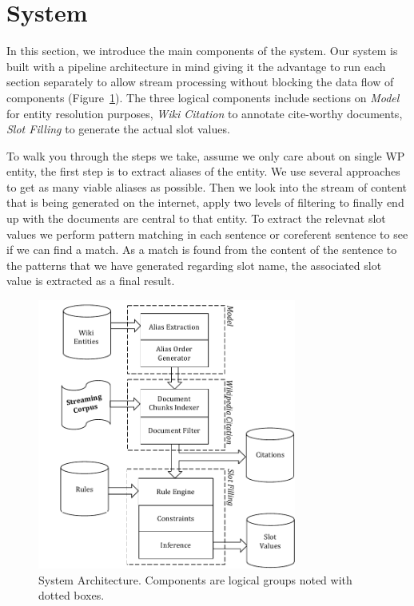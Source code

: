 
\section{System}

In this section, we introduce the main components of the system. Our system is built with a pipeline architecture in mind giving it the advantage to run each section separately to allow stream processing without blocking the data flow of components (Figure~\ref{fig:system}). The three logical components include sections on \textit{Model} for entity resolution purposes, \textit{Wiki Citation} to annotate cite-worthy documents, \textit{Slot Filling} to generate the actual slot values.


To walk you through the steps we take, assume we only care about on single WP entity, the first step is to extract aliases of the entity. We use several approaches to get as many viable aliases as possible. Then we look into the stream of content that is being generated on the internet, apply two levels of filtering to finally end up with the documents are central to that entity. To extract the relevnat slot values we perform pattern matching in each sentence or coreferent sentence to see if we can find a match. As a match is found from the content of the sentence to the patterns that we have generated regarding slot name, the associated slot value is extracted as a final result.


\begin{figure}
\hspace{-10mm}
  \centering
  \includegraphics[width=8.5cm]{./images/System_Diagram_with_model_Vertical-crop.pdf}
  \vspace*{-.1in} 
  \caption{System Architecture.
  Components are logical groups noted with dotted boxes.}
  \label{fig:system}
  \vspace*{-.2in}
\end{figure}



